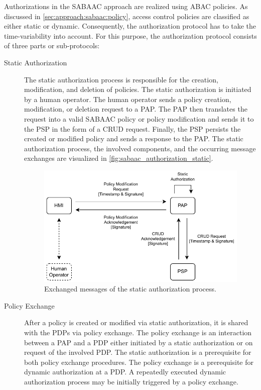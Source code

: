 Authorizations in the SABAAC approach are realized using ABAC policies.
As discussed in \autoref{sec:approach:sabaac:policy}, access control policies are classified as either static or dynamic.
Consequently, the authorization protocol has to take the time-variability into account.
For this purpose, the authorization protocol consists of three parts or sub-protocols:
\begin{description}
    \item[Static Authorization] The static authorization process is responsible for the creation, modification, and deletion of policies.
    The static authorization is initiated by a human operator.
    The human operator sends a policy creation, modification, or deletion request to a PAP.
    The PAP then translates the request into a valid SABAAC policy or policy modification and sends it to the PSP in the form of a CRUD request.
    Finally, the PSP persists the created or modified policy and sends a response to the PAP.
    The static authorization process, the involved components, and the occurring message exchanges are visualized in \autoref{fig:sabaac_authorization_static}.
    \begin{figure}
        \centering
        \includegraphics[width=0.9\linewidth]{figures/SABAAC_protocols_authorization_static.drawio.pdf}
        \caption{Exchanged messages of the static authorization process.
        }
        \label{fig:sabaac_authorization_static}
    \end{figure}
    \item[Policy Exchange] After a policy is created or modified via static authorization, it is shared with the PDPs via policy exchange.
    The policy exchange is an interaction between a PAP and a PDP either initiated by a static authorization or on request of the involved PDP.
    The static authorization is a prerequisite for both policy exchange procedures.
    The policy exchange is a prerequisite for dynamic authorization at a PDP.
    A repeatedly executed dynamic authorization process may be initially triggered by a policy exchange.


\end{description}
